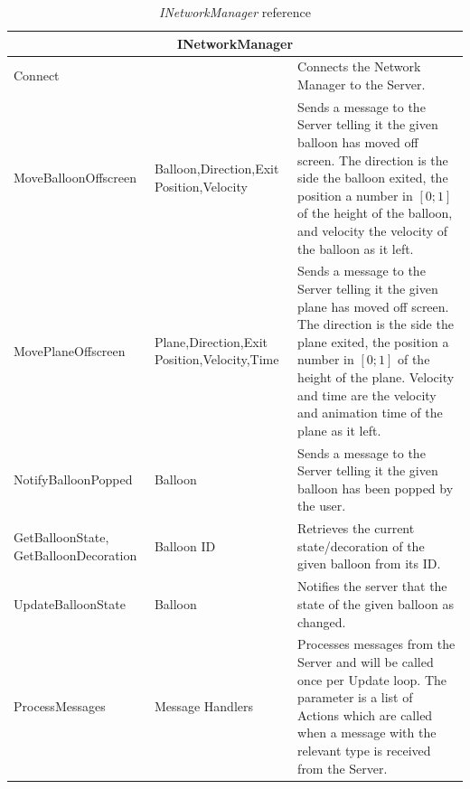 \begin{table}[H]
\begin{tabular}{|p{4.4cm}|p{3.8cm}|p{7.4cm}|}
\hline
\multicolumn{3}{|c|}{INetworkManager} \\ \hline
Connect & & Connects the Network Manager to the Server. \\ \hline

MoveBalloonOffscreen & Balloon,\newline Direction,\newline Exit Position,\newline Velocity &
Sends a message to the Server telling it the given balloon has moved off 
screen. The direction is the side the balloon exited, the position a number 
in $[0;1]$ of the height of the balloon, and velocity the velocity of the
balloon as it left. \\ \hline

MovePlaneOffscreen & Plane,\newline Direction,\newline Exit Position,\newline Velocity,\newline Time &
Sends a message to the Server telling it the given plane has moved off 
screen. The direction is the side the plane exited, the position a number 
in $[0;1]$ of the height of the plane. Velocity and time are the velocity and
animation time of the plane as it left. \\ \hline

NotifyBalloonPopped & Balloon & 
Sends a message to the Server telling it the given balloon has been popped by
the user. \\ \hline

GetBalloonState, \newline GetBalloonDecoration & Balloon ID &
Retrieves the current state/decoration of the given balloon from its ID. \\ \hline

UpdateBalloonState & Balloon & 
Notifies the server that the state of the given balloon as changed. \\ \hline

ProcessMessages & Message Handlers &
Processes messages from the Server and will be called once per Update loop. 
The parameter is a list of Actions which are called when a message with the 
relevant type is received from the Server. \\ \hline
\end{tabular}

\caption{\emph{INetworkManager} reference}

\label{NetworkManagerRef}
\end{table}


